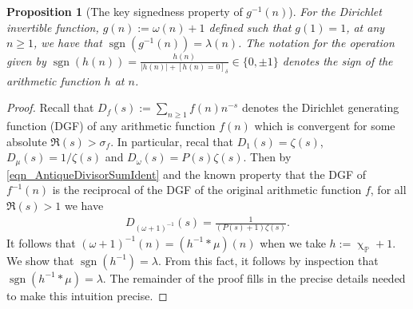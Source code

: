 \documentclass[11pt,reqno,a4letter]{article}
\numberwithin{figure}{section}
\numberwithin{table}{section}
\newcommand{\Iverson}[1]{\ensuremath{\left[#1\right]_{\delta}}}
\renewcommand{\chi}{\upchi}
\theoremstyle{plain}
\newtheorem{prop}[theorem]{Proposition}
\numberwithin{theorem}{section}
\theoremstyle{definition}
\newcommand{\NBRef}[1]{}
\begin{document}
\begin{prop}[The key signedness property of $g^{-1}(n)$]
\label{prop_SignageDirInvsOfPosBddArithmeticFuncs_v1} 
For the Dirichlet invertible function, $g(n) := \omega(n) + 1$ defined such that $g(1) = 1$, at any 
$n \geq 1$, we have that $\operatorname{sgn}(g^{-1}(n)) = \lambda(n)$. 
The notation for the operation given by 
$\operatorname{sgn}(h(n)) = \frac{h(n)}{|h(n)| + \Iverson{h(n) = 0}} \in \{0, \pm 1\}$ denotes the sign 
of the arithmetic function $h$ at $n$. 
\NBRef{A02-2020-04-26}
\end{prop} 
\begin{proof} 
Recall that $D_f(s) := \sum_{n \geq 1} f(n) n^{-s}$ denotes the Dirichlet generating function (DGF) of any 
arithmetic function $f(n)$ which is convergent for some absolute $\Re(s) > \sigma_f$. 
In particular, recal that $D_1(s) = \zeta(s)$, $D_{\mu}(s) = 1 / \zeta(s)$ and $D_{\omega}(s) = P(s) \zeta(s)$. 
Then by \eqref{eqn_AntiqueDivisorSumIdent} and the known property that the DGF of $f^{-1}(n)$ is 
the reciprocal of the DGF of the original arithmetic function $f$, for all $\Re(s) > 1$ we have 
\begin{align} 
\label{eqn_DGF_of_gInvn} 
D_{(\omega+1)^{-1}}(s) = \frac{1}{(P(s)+1) \zeta(s)}. 
\end{align} 
It follows that $(\omega + 1)^{-1}(n) = (h^{-1} \ast \mu)(n)$ when we take 
$h := \chi_{\mathbb{P}} + 1$. 
We show that $\operatorname{sgn}(h^{-1}) = \lambda$. From this fact, it follows by inspection 
that $\operatorname{sgn}(h^{-1} \ast \mu) = \lambda$. The remainder of the proof fills in the 
precise details needed to make this intuition precise. 


\end{proof}
\end{document}
